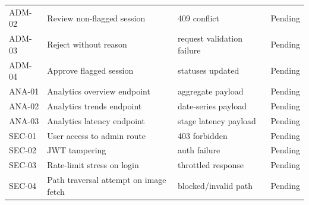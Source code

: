 \begin{longtable}{p{1.6cm}p{5.8cm}p{3.2cm}p{3.8cm}}
ADM-02 & Review non-flagged session & 409 conflict & Pending \\
ADM-03 & Reject without reason & request validation failure & Pending \\
ADM-04 & Approve flagged session & statuses updated & Pending \\
ANA-01 & Analytics overview endpoint & aggregate payload & Pending \\
ANA-02 & Analytics trends endpoint & date-series payload & Pending \\
ANA-03 & Analytics latency endpoint & stage latency payload & Pending \\
SEC-01 & User access to admin route & 403 forbidden & Pending \\
SEC-02 & JWT tampering & auth failure & Pending \\
SEC-03 & Rate-limit stress on login & throttled response & Pending \\
SEC-04 & Path traversal attempt on image fetch & blocked/invalid path & Pending \\
\bottomrule
\end{longtable}
